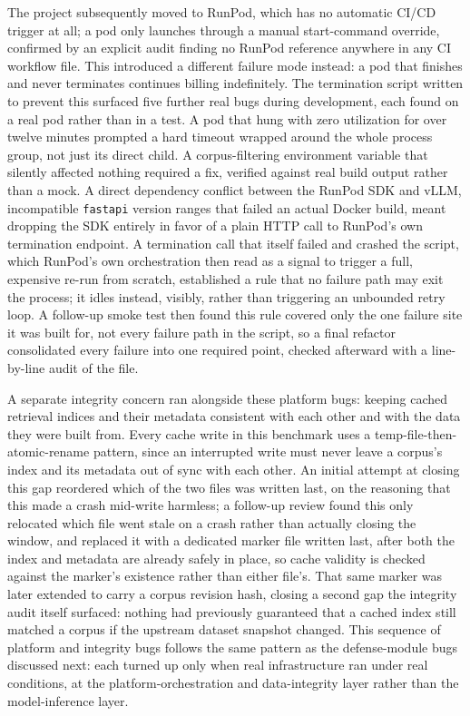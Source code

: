 The project subsequently moved to RunPod, which has no automatic
CI/CD trigger at all; a pod only launches through a manual
start-command override, confirmed by an explicit audit finding no
RunPod reference anywhere in any CI workflow file. This introduced a
different failure mode instead: a pod that finishes and never
terminates continues billing indefinitely. The termination script
written to prevent this surfaced five further real bugs during
development, each found on a real pod rather than in a test. A pod
that hung with zero utilization for over twelve minutes prompted a
hard timeout wrapped around the whole process group, not just its
direct child. A corpus-filtering environment variable that silently
affected nothing required a fix, verified against real build output
rather than a mock. A direct dependency conflict between the RunPod
SDK and vLLM, incompatible \texttt{fastapi} version ranges that failed
an actual Docker build, meant dropping the SDK entirely in favor of a
plain HTTP call to RunPod's own termination endpoint. A termination
call that itself failed and crashed the script, which RunPod's own
orchestration then read as a signal to trigger a full, expensive
re-run from scratch, established a rule that no failure path may exit
the process; it idles instead, visibly, rather than triggering an
unbounded retry loop. A follow-up smoke test then found this rule
covered only the one failure site it was built for, not every failure
path in the script, so a final refactor consolidated every failure
into one required point, checked afterward with a line-by-line audit
of the file.

A separate integrity concern ran alongside these platform bugs:
keeping cached retrieval indices and their metadata consistent with
each other and with the data they were built from. Every cache write
in this benchmark uses a temp-file-then-atomic-rename pattern, since
an interrupted write must never leave a corpus's index and its
metadata out of sync with each other. An initial attempt at closing
this gap reordered which of the two files was written last, on the
reasoning that this made a crash mid-write harmless; a follow-up
review found this only relocated which file went stale on a crash
rather than actually closing the window, and replaced it with a
dedicated marker file written last, after both the index and metadata
are already safely in place, so cache validity is checked against the
marker's existence rather than either file's. That same marker was
later extended to carry a corpus revision hash, closing a second gap
the integrity audit itself surfaced: nothing had previously guaranteed
that a cached index still matched a corpus if the upstream dataset
snapshot changed. This sequence of platform and integrity bugs follows
the same pattern as the defense-module bugs discussed next: each turned
up only when real infrastructure ran under real conditions, at the
platform-orchestration and data-integrity layer rather than the
model-inference layer.

